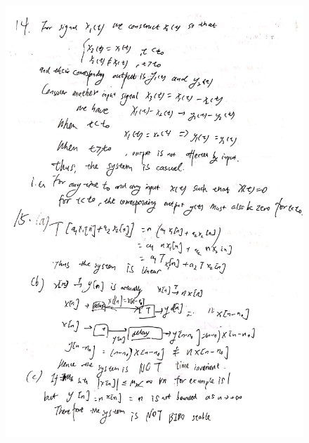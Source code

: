 \documentclass[a4paper]{article}
\begin{document}
\begin{figure}[H]
  \begin{center}
    \includegraphics[width=1\textwidth]{14-15(c).jpg}
  \end{center}
\end{figure}
\end{document}
